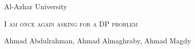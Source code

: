 \documentclass[letterpaper]{article} %
\begin{document}
  \thispagestyle{fancy}
  
  \begin{center}
  	\huge Al-Azhar University
  	
    \Huge\textsc{I am once again asking for a DP problem}
    
    \LARGE Ahmad Abdulrahman, Ahmad Almaghraby, Ahmad Magdy
   	
    \vspace{0.50cm}
  \end{center}

  \begin{multicols*}{2}
    \tableofcontents
  \end{multicols*}
  
  \enlargethispage*{\baselineskip}
  \pagebreak
  
  
  \setcounter{page}{1}
  
  \begin{multicols*}{2}
    
  \end{multicols*}
\end{document}
